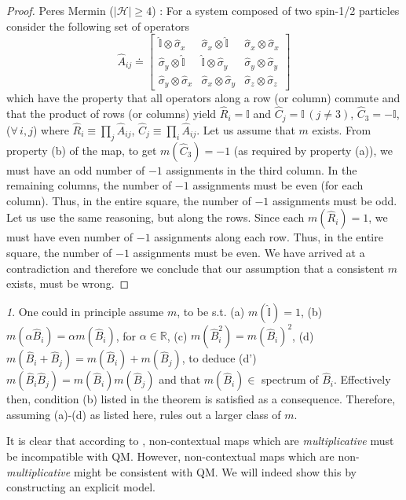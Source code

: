\documentclass[british,aps,prl,superscriptaddress,nofootinbib,times,reprint]{revtex4-1}
\theoremstyle{plain}
\theoremstyle{definition}
\theoremstyle{remark}
\newtheorem{rem}[thm]{\protect\remarkname}
\theoremstyle{plain}
\theoremstyle{plain}
\theoremstyle{plain}
\theoremstyle{definition}
\theoremstyle{definition}
\providecommand{\remarkname}{Remark}
\begin{document}
\begin{proof} Peres Mermin
($\left|\mathcal{H}\right|\ge4$)
\cite{Peres,Mermin}:
For a system composed of two spin-1/2 particles 
consider the following set of operators \[
\hat{A}_{ij}\doteq\left[\begin{array}{ccc}
\hat{\mathbb{I}}\otimes\hat{\sigma}_{x} &
\hat{\sigma}_{x}\otimes\hat{\mathbb{I}} &
\hat{\sigma}_{x}\otimes\hat{\sigma}_{x}\\
\hat{\sigma}_{y}\otimes\hat{\mathbb{I}} &
\hat{\mathbb{I}}\otimes\hat{\sigma}_{y} &
\hat{\sigma}_{y}\otimes\hat{\sigma}_{y}\\
\hat{\sigma}_{y}\otimes\hat{\sigma}_{x} &
\hat{\sigma}_{x}\otimes\hat{\sigma}_{y} &
\hat{\sigma}_{z}\otimes\hat{\sigma}_{z}
\end{array}\right] \] which have the property that
all operators along a row (or column) commute and
that the product of rows (or columns) yield
$\hat{R}_{i}=\mathbb{I}$ and
$\hat{C}_{j}=\mathbb{I}\,(j\neq3)$,
$\hat{C}_{3}=-\mathbb{I}$, ($\forall\,i,j$) where
$\hat{R}_{i}\equiv\prod_{j}\hat{A}_{ij}$,
$\hat{C}_{j}\equiv\prod_{i}\hat{A}_{ij}$. Let us
assume that $m$ exists. From property (b) of the
map, to get $m(\hat{C}_{3})=-1$ (as required by
property (a)), we must have an odd number of $-1$
assignments in the third column. In the remaining
columns, the number of $-1$ assignments must be
even (for each column). Thus, in the entire
square, the number of $-1$ assignments must be
odd. Let us use the same reasoning, but along the
rows. Since each $m(\hat{R}_{i})=1$, we must have
even number of $-1$ assignments along each row.
Thus, in the entire square, the number of $-1$
assignments must be even. We have arrived at a
contradiction and therefore we conclude that our
assumption that a consistent $m$ exists, must be
wrong.  \end{proof}

\begin{rem} One could in principle assume $m$, to
be s.t. (a) $m(\hat{\mathbb{I}})=1$, (b)
$m(\alpha\hat{B}_{i})=\alpha m(\hat{B}_{i})$, for
$\alpha\in\mathbb{R}$, (c)
$m(\hat{B}_{i}^{2})=m(\hat{B}_{i})^{2}$, (d)
$m(\hat{B}_{i}+\hat{B}_{j})=m(\hat{B}_{i})+m(\hat{B}_{j})$,
to deduce (d')
$m(\hat{B}_{i}\hat{B}_{j})=m(\hat{B}_{i})m(\hat{B}_{j})$
and that $m(\hat{B}_{i})\in$ spectrum of
$\hat{B}_{i}$. Effectively then, condition (b)
listed in the theorem is satisfied as a
consequence.  Therefore, assuming (a)-(d) as
listed here, rules out a larger class of $m$.
\cite{KochenSpecker} 
\end{rem} 
It is clear that 
according to
, non-contextual maps which are
\emph{multiplicative} must be incompatible with
QM. However, non-contextual maps which are
non-\emph{multiplicative} might be consistent with
QM. We will indeed show this by constructing an
explicit model.
\end{document}
